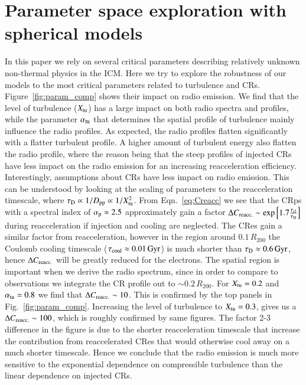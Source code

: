 \documentclass[fleqn,usenatbib,useAMS]{mnras}
\begin{document}
\section{Parameter space exploration with spherical models}
\label{sect:param_comp}
In this paper we rely on several critical parameters describing
relatively unknown non-thermal physics in the ICM. Here we try to
explore the robustness of our models to the most critical parameters
related to turbulence and CRs. Figure~\ref{fig:param_comp} shows their
impact on radio emission. We find that the level of turbulence
($X_{\mathrm{tu}}$) has a large impact on both radio spectra and profiles,
while the parameter $\alpha_{\mathrm{tu}}$ that determines the spatial
profile of turbulence mainly influence the radio profiles. As
expected, the radio profiles flatten significantly with a flatter
turbulent profile. A higher amount of turbulent energy also flatten
the radio profile, where the reason being that the steep profiles of
injected CRs have less impact on the radio emission for an increasing
reacceleration efficiency. Interestingly, assumptions about CRs have
less impact on radio emission. This can be understood by looking at
the scaling of parameters to the reacceleration timescale, where
$\tau_{\mathrm{D}} \propto 1/D_{\mathrm{pp}} \propto 1/X_{\mathrm{tu}}^2$. From
Eqn.~\ref{eq:Creacc} we see that the CRps with a spectral index of
$\alpha_{\mathrm{p}}\approx2.5$ approximately gain a factor $\Delta
C_{\mathrm{reacc.}} \sim
\exp{\left[1.7\frac{\tau_{\mathrm{cl}}}{\tau_{\mathrm{D}}}\right]}$ during
reacceleration if injection and cooling are neglected. The CRes gain a
similar factor from reacceleration, however in the region around
$0.1\,R_{200}$ the Coulomb cooling timescale
($\tau_{\mathrm{coul}}\approx0.01\,{\mathrm{Gyr}}$) is much shorter than
$\tau_{\mathrm{D}}\approx0.6\,{\mathrm{Gyr}}$, hence $\Delta C_{\mathrm{reacc.}}$
will be greatly reduced for the electrons. The spatial region is
important when we derive the radio spectrum, since in order to compare
to observations we integrate the CR profile out to $\sim
0.2\,R_{200}$. For $X_{\mathrm{tu}}=0.2$ and $\alpha_{\mathrm{tu}}=0.8$ we find
that $\Delta C_{\mathrm{reacc.}} \sim 10$. This is confirmed by the top
panels in Fig.~\ref{fig:param_comp}. Increasing the level of
turbulence to $X_{\mathrm{tu}}=0.3$, gives us a $\Delta C_{\mathrm{reacc.}}
\sim 100$, which is roughly confirmed by same figures. The factor 2-3
difference in the figure is due to the shorter reacceleration
timescale that increase the contribution from reaccelerated CRes that
would otherwise cool away on a much shorter timescale. Hence we
conclude that the radio emission is much more sensitive to the
exponential dependence on compressible turbulence than the linear
dependence on injected CRs.
\end{document}
